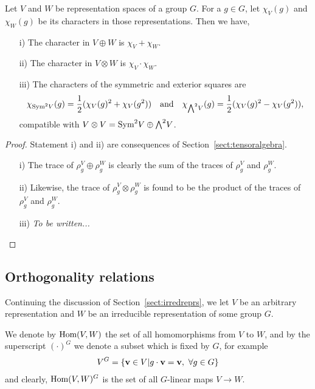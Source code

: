 \begin{proposition}\label{prop:charplustimes}
	Let $V$ and $W$ be representation spaces of a group $G$. For a $g \in G$, let $\chi_V(g)$ and $\chi_W(g)$ be its characters in those representations. Then we have,
	\begin{enumerate}
		\item[i)] The character in $V \oplus W$ is $\chi_V+\chi_W$.
		\item[ii)] The character in $V \otimes W$ is $\chi_V \cdot \chi_W$.
		\item[iii)] The characters of the symmetric and exterior squares are \begin{align*}
			\chi_{\text{Sym}^2 V}(g) = \frac{1}{2}(\chi_V(g)^2 + \chi_V(g^2)) \quad \text{and} \quad \chi_{{\bigwedge}^2 V}(g) = \frac{1}{2}(\chi_V(g)^2 - \chi_V(g^2)),
		\end{align*} compatible with $V \otimes V = \text{Sym}^2 V \oplus {\bigwedge}^2 V$.
	\end{enumerate}
\end{proposition}
\begin{proof}
	Statement i) and ii) are consequences of Section~\ref{sect:tensoralgebra}. 
	\begin{enumerate}
		\item[i)] The trace of $\rho_g^V \oplus \rho_g^W$ is clearly the sum of the traces of $\rho_g^V$ and $\rho_g^W$.
		\item[ii)] Likewise, the trace of $\rho_g^V \otimes \rho_g^W$ is found to be the product of the traces of $\rho_g^V$ and $\rho_g^W$.
		\item[iii)] \textit{To be written...} \qedhere
	\end{enumerate}
\end{proof}

\subsection{Orthogonality relations}

Continuing the discussion of Section~\ref{sect:irredreprs}, we let $V$ be an arbitrary representation and $W$ be an irreducible representation of some group $G$. 

We denote by $\text{Hom} (V,W)$ the set of all homomorphisms from $V$ to $W$, and by the superscript $(\cdot) ^G$ we denote a subset which is fixed by $G$, for example 
\begin{align}\label{eq:defVG}
	V^G = \left\lbrace \vvec \in V \middle\vert g\cdot \vvec = \vvec, \ \forall g \in G \right\rbrace
\end{align} 
and clearly, $\text{Hom}(V,W)^G$ is the set of all $G$-linear maps $V \rightarrow W$.

